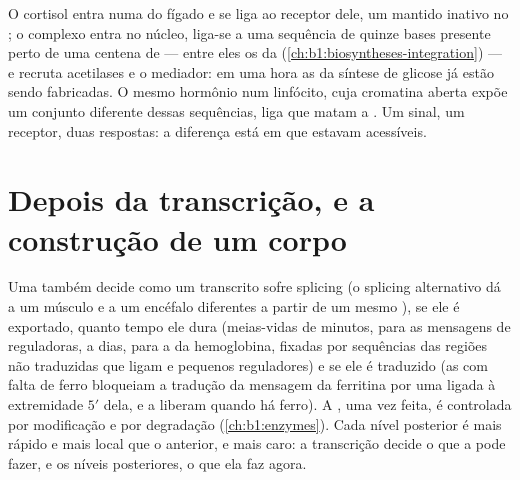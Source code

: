 \begin{example}\label{ex:b1:expression-control:steroid}
O cortisol entra numa  do fígado e se liga ao receptor dele, um
 mantido inativo no ; o complexo entra no
núcleo, liga-se a uma sequência de quinze bases presente perto de uma
centena de  --- entre eles os da 
(\cref{ch:b1:biosyntheses-integration}) --- e recruta acetilases e o
mediador: em uma hora as  da síntese de glicose já estão sendo
fabricadas. O mesmo hormônio num linfócito, cuja cromatina aberta expõe
um conjunto diferente dessas sequências, liga  que matam a .
Um sinal, um receptor, duas respostas: a diferença está em que 
estavam acessíveis.
\end{example}

\section{Depois da transcrição, e a construção de um corpo}

\begin{proposition}\label{prop:b1:expression-control:posttranscriptional}
Uma  também decide como um transcrito sofre splicing
(o splicing alternativo dá a um músculo e a um encéfalo 
diferentes a partir de um mesmo ), se ele é exportado, quanto tempo
ele dura (meias-vidas de minutos, para as mensagens de 
reguladoras, a dias, para a da hemoglobina, fixadas por sequências das
regiões não traduzidas que ligam  e pequenos  reguladores)
e se ele é traduzido (as  com falta de ferro bloqueiam a tradução
da mensagem da ferritina por uma  ligada à extremidade $5'$
dela, e a liberam quando há ferro). A , uma vez feita, é
controlada por modificação e por degradação (\cref{ch:b1:enzymes}). Cada
nível posterior é mais rápido e mais local que o anterior, e mais caro:
a transcrição decide o que a  pode fazer, e os níveis posteriores,
o que ela faz agora.
\end{proposition}

